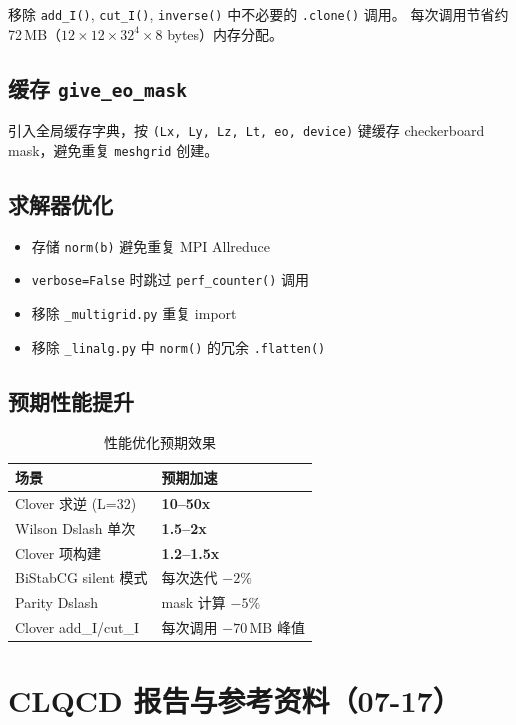 \documentclass[11pt,a4paper]{article}
\begin{document}
移除 \texttt{add\_I()}, \texttt{cut\_I()}, \texttt{inverse()} 中不必要的 \texttt{.clone()} 调用。
每次调用节省约 72\,MB（$12\times12\times32^4\times8$ bytes）内存分配。

\subsection{缓存 \texttt{give\_eo\_mask}}

引入全局缓存字典，按 \texttt{(Lx, Ly, Lz, Lt, eo, device)} 键缓存 checkerboard mask，避免重复 \texttt{meshgrid} 创建。

\subsection{求解器优化}

\begin{itemize}
    \item 存储 \texttt{norm(b)} 避免重复 MPI Allreduce
    \item \texttt{verbose=False} 时跳过 \texttt{perf\_counter()} 调用
    \item 移除 \texttt{\_multigrid.py} 重复 import
    \item 移除 \texttt{\_linalg.py} 中 \texttt{norm()} 的冗余 \texttt{.flatten()}
\end{itemize}

\subsection{预期性能提升}

\begin{table}[ht]
\centering
\caption{性能优化预期效果}
\begin{tabular}{ll}
\toprule
场景 & 预期加速 \\
\midrule
Clover 求逆 (L=32) & \textbf{10--50x} \\
Wilson Dslash 单次 & \textbf{1.5--2x} \\
Clover 项构建 & \textbf{1.2--1.5x} \\
BiStabCG silent 模式 & 每次迭代 $-2\%$ \\
Parity Dslash & mask 计算 $-5\%$ \\
Clover add\_I/cut\_I & 每次调用 $-70$\,MB 峰值 \\
\bottomrule
\end{tabular}
\end{table}

\section{CLQCD 报告与参考资料（07-17）}
\end{document}
